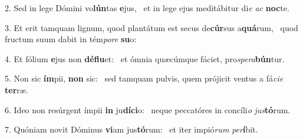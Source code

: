 2. Sed in lege Dómini vo\textbf{lún}tas \textbf{e}jus, \ast\  et in lege ejus meditábitur di\textit{e} \textit{ac} \textbf{noc}te.\

3. Et erit tamquam lignum, quod plantátum est secus de\textbf{cúr}sus a\textbf{quá}rum, \ast\  quod fructum suum dabit in tém\textit{po}\textit{re} \textbf{su}o:\

4. Et fólium \textbf{e}jus non \textbf{dé}\textbf{flu}et: \ast\  et ómnia quæcúmque fáciet, pro\textit{spe}\textit{ra}\textbf{bún}tur.\

5. Non sic \textbf{ím}pii, \textbf{non} sic: \ast\  sed tamquam pulvis, quem prójicit ventus a fá\textit{ci}\textit{e} \textbf{ter}ræ.\

6. Ideo non resúrgent ímpii \textbf{in} ju\textbf{dí}\textbf{ci}o: \ast\  neque peccatóres in concíli\textit{o} \textit{jus}\textbf{tó}rum.\

7. Quóniam novit Dóminus \textbf{vi}am jus\textbf{tó}rum: \ast\  et iter impió\textit{rum} \textit{per}\textbf{í}bit.\

